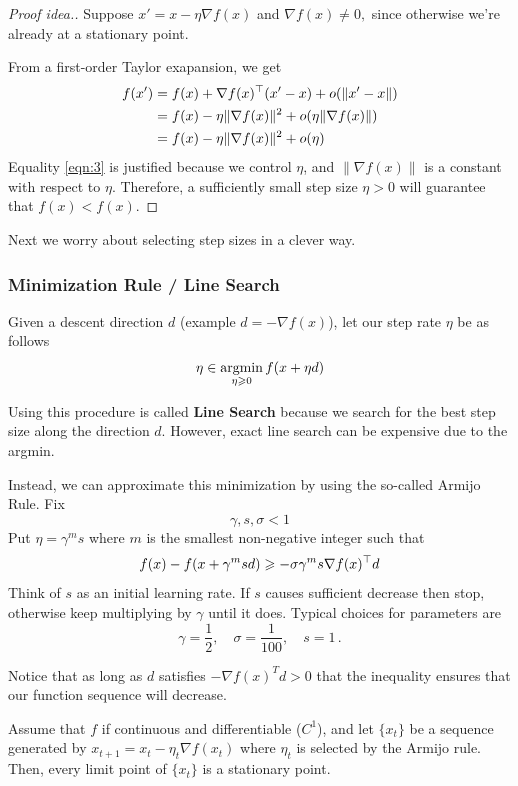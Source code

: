 \begin{proof}[Proof idea.]
Suppose $x' = x - \eta \nabla f(x)$ and $\nabla f(x)\ne 0,$ since otherwise
we're already at a stationary point.

From a first-order Taylor exapansion, we get
\begin{align}
    f(x') &= f(x) + \nabla f(x)^\top (x' - x) + o(\|x' - x\|) \nonumber\\
    &= f(x) - \eta\|\nabla f(x)\|^2 + o(\eta \|\nabla f(x)\|) \nonumber\\
    &= f(x) - \eta \|\nabla f(x)\|^2 + o(\eta) \label{eqn:3}
\end{align}
Equality \ref{eqn:3} is justified because we control $\eta$, and $\|\nabla
f(x)\|$ is a constant with respect to $\eta$. Therefore, a sufficiently small
step size $\eta>0$ will guarantee that $f(x)<f(x).$
\end{proof}

Next we worry about selecting step sizes in a clever way.

\subsubsection{Minimization Rule / Line Search}

Given a descent direction $d$ (example $d = - \nabla f(x)$), let our step rate $\eta$ be as follows
\[
    \eta \in \mathop{\rm argmin}_{\eta \geqslant 0} f(x + \eta d)
\]

Using this procedure is called \textbf{Line Search} because we search for the best step size along the direction $d$. However, exact line search can be expensive due to the argmin.

Instead, we can approximate this minimization by using the so-called Armijo Rule. 
Fix 
\[
    \gamma, s, \sigma < 1
\]
Put $\eta = \gamma^m s$ where $m$ is the smallest non-negative integer such that
\[
    f(x) - f(x + \gamma^m s d) \geqslant - \sigma \gamma^m s \nabla f(x)^\top d
\]
Think of $s$ as an initial learning rate. If $s$ causes sufficient decrease then
stop, otherwise keep multiplying by $\gamma$ until it does. 
Typical choices for parameters are 
\[
    \gamma = \frac{1}{2},\quad \sigma = \frac{1}{100},\quad s = 1\,.
\]

Notice that as long as $d$ satisfies $-\nabla f(x)^Td > 0$ that the inequality ensures that our function sequence will decrease.

\begin{proposition}
Assume that $f$ if continuous and differentiable ($C^1$), and let $\{x_t\}$ be a sequence generated by $x_{t+1} = x_t - \eta_t \nabla f(x_t)$ where $\eta_t$ is selected by the Armijo rule. Then, every limit point of $\{x_t\}$ is a stationary point.
\end{proposition}

